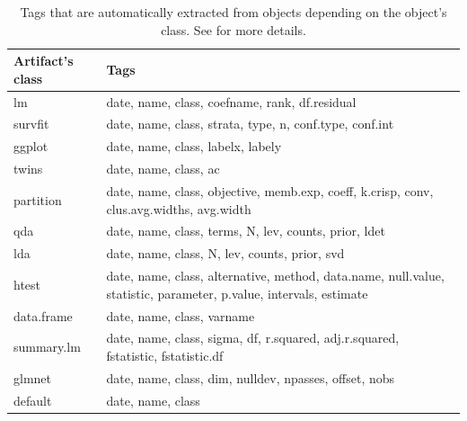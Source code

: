 \documentclass[nojss]{jss}\usepackage[]{graphicx}\usepackage[]{color}
\begin{document}
\begin{table}[h!]
\begin{center}
\begin{tabular}{p{3cm}p{11cm}}
\hline
Artifact's class & Tags \\ \hline
lm & date, name, class, coefname, rank, df.residual  \\ 
survfit & date, name, class, strata, type, n, conf.type, conf.int \\ 
ggplot & date, name, class, labelx, labely \\ 
twins & date, name, class, ac \\ 
partition & date, name, class, objective, memb.exp, coeff, k.crisp, conv, clus.avg.widths, avg.width \\ 
qda & date, name, class, terms, N, lev, counts, prior, ldet \\ 
lda & date, name, class, N, lev, counts, prior, svd \\
htest & date, name, class, alternative, method, data.name, null.value, statistic, parameter, p.value, intervals, estimate\\ 
data.frame & date, name, class, varname \\ 
summary.lm & date, name, class, sigma, df, r.squared, adj.r.squared, fstatistic, fstatistic.df \\
glmnet & date, name, class, dim, nulldev, npasses, offset, nobs \\
default & date, name, class \\ 
\hline
\end{tabular}
\caption{\label{tab:tags}Tags that are automatically extracted from objects depending on the object's class. See  for more details.}
\end{center}
\end{table}
\end{document}
